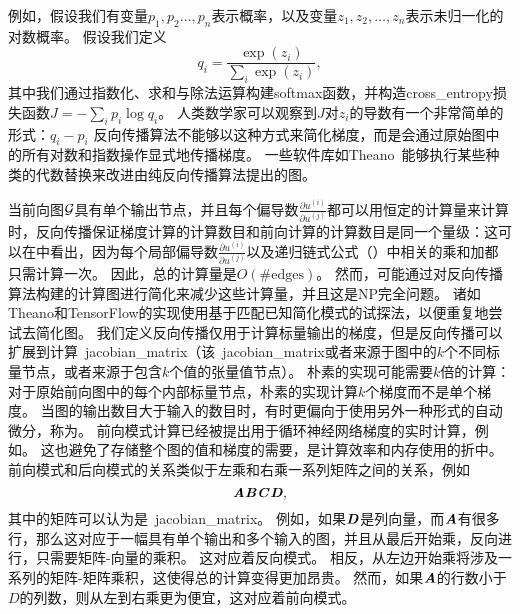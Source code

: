 例如，假设我们有变量$p_1,p_2\ldots,p_n$表示概率，以及变量$z_1,z_2,\ldots,z_n$表示未归一化的对数概率。
假设我们定义
\begin{equation}
  q_i = \frac{\exp(z_i)}{\sum_i \exp(z_i)},
\end{equation}
其中我们通过指数化、求和与除法运算构建softmax函数，并构造\gls{cross_entropy}损失函数$J=-\sum_i p_i\log q_i$。
人类数学家可以观察到$J$对$z_i$的导数有一个非常简单的形式：$q_i-p_i$
反向传播算法不能够以这种方式来简化梯度，而是会通过原始图中的所有对数和指数操作显式地传播梯度。
一些软件库如Theano~\citep{bergstra+al:2010-scipy-small,Bastien-Theano-2012}能够执行某些种类的代数替换来改进由纯反向传播算法提出的图。
  
  
当前向图$\mathcal{G}$具有单个输出节点，并且每个偏导数$\frac{\partial u^{(i)}}{\partial u^{(j)}}$都可以用恒定的计算量来计算时，反向传播保证梯度计算的计算数目和前向计算的计算数目是同一个量级：这可以在中看出，因为每个局部偏导数$\frac{\partial u^{(i)}}{\partial u^{(j)}}$以及递归链式公式（）中相关的乘和加都只需计算一次。
因此，总的计算量是$O(\#\text{edges})$。
然而，可能通过对反向传播算法构建的计算图进行简化来减少这些计算量，并且这是NP完全问题。
诸如Theano和TensorFlow的实现使用基于匹配已知简化模式的试探法，以便重复地尝试去简化图。
我们定义反向传播仅用于计算标量输出的梯度，但是反向传播可以扩展到计算~\gls{jacobian_matrix}（该~\gls{jacobian_matrix}或者来源于图中的$k$个不同标量节点，或者来源于包含$k$个值的张量值节点）。
朴素的实现可能需要$k$倍的计算：对于原始前向图中的每个内部标量节点，朴素的实现计算$k$个梯度而不是单个梯度。
当图的输出数目大于输入的数目时，有时更偏向于使用另外一种形式的自动微分，称为。
前向模式计算已经被提出用于循环神经网络梯度的实时计算，例如\citep{Williams89b}。
这也避免了存储整个图的值和梯度的需要，是计算效率和内存使用的折中。
前向模式和后向模式的关系类似于左乘和右乘一系列矩阵之间的关系，例如
\begin{equation}
  \boldsymbol{\mathit{A}} \boldsymbol{\mathit{B}} \boldsymbol{\mathit{C}} \boldsymbol{\mathit{D}},
\end{equation}
其中的矩阵可以认为是~\gls{jacobian_matrix}。
例如，如果$\boldsymbol{\mathit{D}}$是列向量，而$\boldsymbol{\mathit{A}}$有很多行，那么这对应于一幅具有单个输出和多个输入的图，并且从最后开始乘，反向进行，只需要矩阵-向量的乘积。
这对应着反向模式。
相反，从左边开始乘将涉及一系列的矩阵-矩阵乘积，这使得总的计算变得更加昂贵。
然而，如果$\boldsymbol{\mathit{A}}$的行数小于$D$的列数，则从左到右乘更为便宜，这对应着前向模式。

